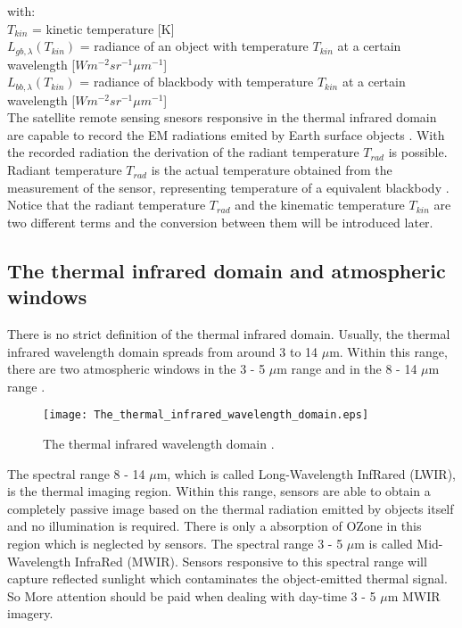 \noindent with:\\
\indent $T_{kin}$ = kinetic temperature [K]\\
\indent $L_{gb, \lambda}(T_{kin})$ = radiance of an object with temperature $T_{kin}$ at a certain wavelength [$W m^{-2} sr^{-1} \mu m^{-1}$]\\
\indent $L_{bb, \lambda}(T_{kin})$ = radiance of blackbody with temperature $T_{kin}$ at a certain wavelength [$W m^{-2} sr^{-1} \mu m^{-1}$]\\

\noindent The satellite remote sensing snesors responsive in the thermal infrared domain are capable to record the EM radiations emited by Earth surface objects \parencite{Reference204}. With the recorded radiation the derivation of the radiant temperature $T_{rad}$ is possible. Radiant temperature $T_{rad}$ is the actual temperature obtained from the measurement of the sensor, representing temperature of a equivalent blackbody \parencite{Reference206}. Notice that the radiant temperature $T_{rad}$ and the kinematic temperature $T_{kin}$ are two different terms and the conversion between them will be introduced later.\\


\subsection{The thermal infrared domain and atmospheric windows}
There is no strict definition of the thermal infrared domain. Usually, the thermal infrared wavelength domain spreads from around 3 to 14 $\mu$m. Within this range, there are two atmospheric windows in the 3 - 5 $\mu$m range and in the 8 - 14 $\mu$m range \parencite{Reference204}. \\

\begin{figure}[!htbp]
  \centering\texttt{[image: The\_thermal\_infrared\_wavelength\_domain.eps]}
  \caption{The thermal infrared wavelength domain \parencite{Reference204}.}
  \label{fig:TIRdomain}
\end{figure}

\noindent The spectral range 8 - 14 $\mu$m, which is called Long-Wavelength InfRared (LWIR), is the thermal imaging region. Within this range, sensors are able to obtain a completely passive image based on the thermal radiation emitted by objects itself and no illumination is required. There is only a absorption of OZone in this region which is neglected by sensors. The spectral range 3 - 5 $\mu$m is called Mid-Wavelength InfraRed (MWIR). Sensors responsive to this spectral range will capture reflected sunlight which contaminates the object-emitted thermal signal. So More attention should be paid when dealing with day-time 3 - 5 $\mu$m MWIR imagery. \\

